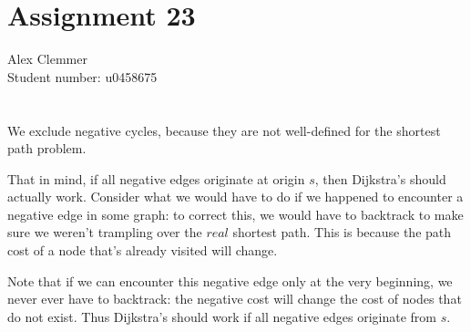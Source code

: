 \documentclass[a4paper]{article}
\begin{document}
\section*{Assignment 23}
Alex Clemmer\\
Student number: u0458675

\section*{}

We exclude negative cycles, because they are not well-defined for the shortest path problem.

That in mind, if all negative edges originate at origin $s$, then Dijkstra's should actually work. Consider what we would have to do if we happened to encounter a negative edge in some graph: to correct this, we would have to backtrack to make sure we weren't trampling over the $\textit{real}$ shortest path. This is because the path cost of a node that's already visited will change.

Note that if we can encounter this negative edge only at the very beginning, we never ever have to backtrack: the negative cost will change the cost of nodes that do not exist. Thus Dijkstra's should work if all negative edges originate from $s$.
\end{document}
